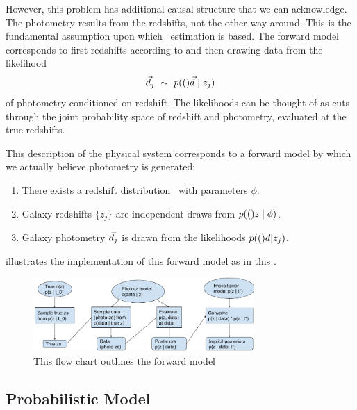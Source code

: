 However, this problem has additional causal structure that we can acknowledge.
The photometry results from the redshifts, not the other way around.
This is the fundamental assumption upon which \pz\ estimation is based.
The forward model corresponds to first redshifts according to  and then drawing data from the likelihood
\begin{equation}
\label{eqn:pzpdf}
\vec{d}_{j}\ \sim\ p(()\vec{d} \mid z_{j})
\end{equation}
of photometry conditioned on redshift.
The likelihoods can be thought of as cuts through the joint probability space of redshift and photometry, evaluated at the true redshifts.


This description of the physical system corresponds to a forward model by which we actually believe photometry is generated:
\begin{enumerate}
	\item There exists a redshift distribution \nz\ with parameters $\phi$.
	\item Galaxy redshifts $\{z_{j}\}$ are independent draws from $p(()z \mid \phi)$.
	\item Galaxy photometry $\vec{d}_{j}$ is drawn from the likelihoods $p(()d | z_{j})$.
\end{enumerate}
 illustrates the implementation of this forward model as in this \paper.

\begin{figure}
	\begin{center}
		\includegraphics[width=0.75\textwidth]{figures/chippr/flowchart.png}
		\caption{This flow chart outlines the forward model}
	\end{center}
\end{figure}

\subsection{Probabilistic Model}

